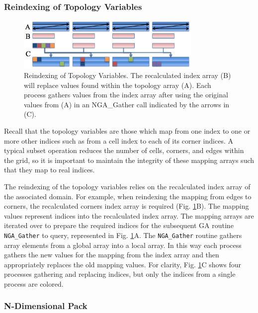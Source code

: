 \subsubsection{Reindexing of Topology Variables}

\begin{figure}[!t]
\center
\includegraphics[width=3.5in]{images/reindex}
\caption{Reindexing of Topology Variables.  The recalculated index array (B)
will replace values found within the topology array (A).  Each process gathers
values from the index array after using the original values from (A) in an
NGA\_Gather call indicated by the arrows in (C).}
\label{fig:reindex}
\end{figure}

Recall that the topology variables are those which map from one index to
one or more other indices such as from a cell index to each of its corner
indices.  A typical subset operation reduces the number of cells, corners, and
edges within the grid, so it is important to maintain the integrity of these
mapping arrays such that they map to real indices.

The reindexing of the topology variables relies on the recalculated index
array of the associated domain.  For example, when reindexing the mapping from
edges to corners, the recalculated corners index array is required (Fig.
\ref{fig:reindex}B).  The mapping values represent indices into the
recalculated index array.  The mapping arrays are iterated over to prepare the
required indices for the subsequent GA routine \verb=NGA_Gather= to query,
represented in Fig.  \ref{fig:reindex}A.  The \verb=NGA_Gather= routine
gathers array elements from a global array into a local array.  In this way
each process gathers the new values for the mapping from the index array and
then appropriately replaces the old mapping values.  For clarity, Fig.
\ref{fig:reindex}C shows four processes gathering and replacing indices, but
only the indices from a single process are colored.

\subsubsection{N-Dimensional Pack}
\label{section:alg_pack}

